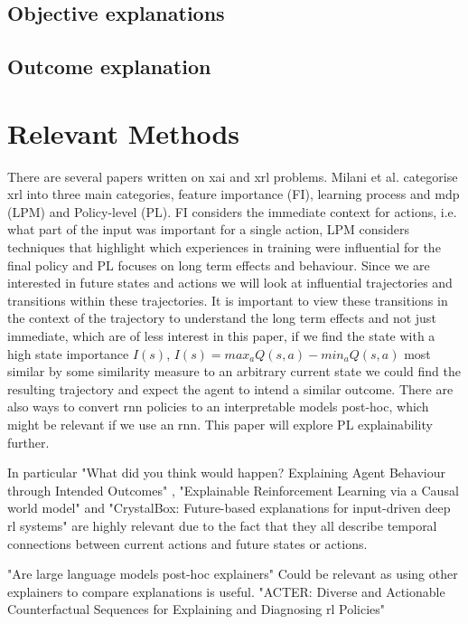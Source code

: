 \documentclass[UKenglish]{uiomasterthesis}
\begin{document}
\subsection{Objective explanations}


\subsection{Outcome explanation}


\section{Relevant Methods}
There are several papers written on \ac{xai} and \ac{xrl} problems. Milani et al.\cite{milani2022survey} categorise \ac{xrl} into three main categories, feature importance (FI), learning process and \ac{mdp} (LPM) and Policy-level (PL). FI considers the immediate context for actions, i.e. what part of the input was important for a single action, LPM considers techniques that highlight which experiences in training were influential for the final policy and PL focuses on long term effects and behaviour. Since we are interested in future states and actions we will look at influential trajectories and transitions within these trajectories. It is important to view these transitions in the context of the trajectory to understand the long term effects and not just immediate, which are of less interest in this paper, if we find the state with a high state importance $I(s)$, $I(s) = max_aQ(s,a)-min_aQ(s,a)$ most similar by some similarity measure to an arbitrary current state we could find the resulting trajectory and expect the agent to intend a similar outcome. There are also ways to convert \ac{rnn} policies to an interpretable models post-hoc, which might be relevant if we use an \ac{rnn}. This paper will explore PL explainability further.

In particular "What did you think would happen? Explaining Agent Behaviour through Intended Outcomes" \cite{yau2020did}, "Explainable Reinforcement Learning via a Causal world model" \cite{yu2024explainable} and "CrystalBox: Future-based explanations for input-driven deep \ac{rl} systems" \cite{patel2024crystalbox} are highly relevant due to the fact that they all describe temporal connections between current actions and future states or actions.

"Are large language models post-hoc explainers" \cite{kroeger2024large} Could be relevant as using other explainers to compare explanations is useful. "ACTER: Diverse and Actionable Counterfactual Sequences for Explaining and Diagnosing \ac{rl} Policies" \cite{gajcin2024acter} 
\end{document}
